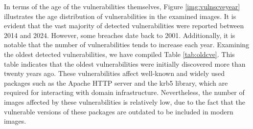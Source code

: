
In terms of the age of the vulnerabilities themselves, Figure \ref{img:vulnscveyear} illustrates the age distribution of vulnerabilities in the examined images. It is evident that the vast majority of detected vulnerabilities were reported between 2014 and 2024. However, some breaches date back to 2001. Additionally, it is notable that the number of vulnerabilities tends to increase each year. Examining the oldest detected vulnerabilities, we have compiled Table \ref{tab:oldcve}. This table indicates that the oldest vulnerabilities were initially discovered more than twenty years ago. These vulnerabilities affect well-known and widely used packages such as the Apache HTTP server and the krb5 library, which are required for interacting with domain infrastructure. Nevertheless, the number of images affected by these vulnerabilities is relatively low, due to the fact that the vulnerable versions of these packages are outdated to be included in modern images.



